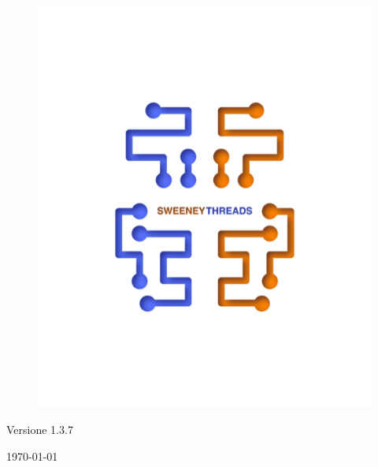 \documentclass[a4paper]{article}
\begin{document}
\begin{titlepage}
		\begin{figure}[H]
			\centering
			\includegraphics[scale=0.8]{sweeney.png}
		\end{figure}
		\begin{center}
			Versione 1.3.7
		\end{center}
		{\large \today}\\[3cm] 
		\vfill  
	\end{titlepage}
	
	
	\tableofcontents
	
	\newpage 
\end{document}
